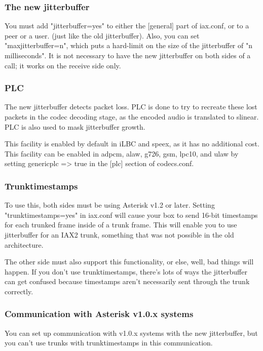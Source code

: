 \subsubsection{The new jitterbuffer}

You must add "jitterbuffer=yes" to either the [general] part of 
iax.conf, or to a peer or a user.  (just like the old jitterbuffer).    
Also, you can set "maxjitterbuffer=n", which puts a hard-limit on the size of the 
jitterbuffer of "n milliseconds".  It is not necessary to have the new jitterbuffer 
on both sides of a call; it works on the receive side only.

\subsubsection{PLC}

The new jitterbuffer detects packet loss.  PLC is done to try to recreate these
lost packets in the codec decoding stage, as the encoded audio is translated to slinear.  
PLC is also used to mask jitterbuffer growth.

This facility is enabled by default in iLBC and speex, as it has no additional cost.
This facility can be enabled in adpcm, alaw, g726, gsm, lpc10, and ulaw by setting 
genericplc => true in the [plc] section of codecs.conf.

\subsubsection{Trunktimestamps}

To use this, both sides must be using Asterisk v1.2 or later.
Setting "trunktimestamps=yes" in iax.conf will cause your box to send 16-bit timestamps 
for each trunked frame inside of a trunk frame. This will enable you to use jitterbuffer
for an IAX2 trunk, something that was not possible in the old architecture.

The other side must also support this functionality, or else, well, bad things will happen.  
If you don't use trunktimestamps, there's lots of ways the jitterbuffer can get confused because 
timestamps aren't necessarily sent through the trunk correctly.

\subsubsection{Communication with Asterisk v1.0.x systems}

You can set up communication with v1.0.x systems with the new jitterbuffer, but
you can't use trunks with trunktimestamps in this communication.

